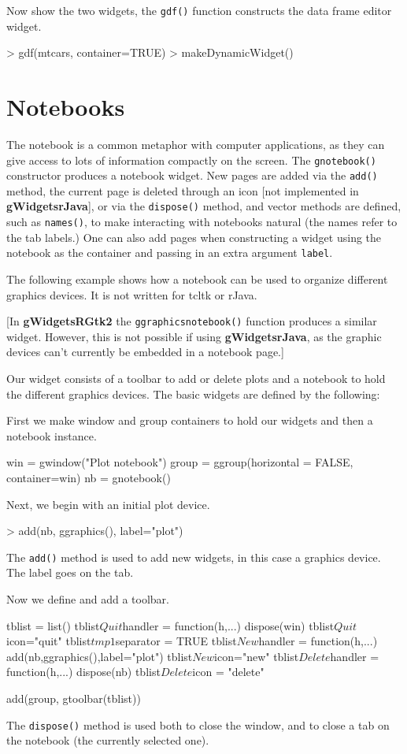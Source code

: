 \documentclass[12pt]{article}
\newcommand{\RCode}[1]{\texttt{#1}}
\newcommand{\RFunc}[1]{\texttt{#1()}}
\newcommand{\RPackage}[1]{\textbf{#1}}
\begin{document}
Now show the two widgets, the \RFunc{gdf} function constructs the data
frame editor widget.
\begin{Soutput}
> gdf(mtcars, container=TRUE)
> makeDynamicWidget()
\end{Soutput}


\section{Notebooks}

The notebook is a common metaphor with computer applications, as they
can give access to lots of information compactly on the screen. The
\RFunc{gnotebook} constructor produces a notebook widget. New pages
are added via the \RFunc{add} method, the current page is deleted
through an icon [not implemented in \RPackage{gWidgetsrJava}], or via
the \RFunc{dispose} method, and vector methods are defined, such as
\RFunc{names}, to make interacting with notebooks natural (the names
refer to the tab labels.) One can also add pages when constructing a
widget using the notebook as the container and passing in an extra
argument \RCode{label}.

The following example shows how a notebook can be used to organize
different graphics devices. It is not written for tcltk or rJava.

[In \RPackage{gWidgetsRGtk2} the
\RFunc{ggraphicsnotebook} function produces a  similar
widget. However, this is not possible if using
\RPackage{gWidgetsrJava}, as the graphic devices can't currently be
embedded in a notebook page.]

Our widget consists of a toolbar to add or delete plots and a notebook
to hold the different graphics devices. The basic widgets are defined
by the following:

First we make window and group containers to hold our widgets and then
a notebook instance.
\begin{Scode}
  win = gwindow("Plot notebook")
  group = ggroup(horizontal = FALSE, container=win)
  nb = gnotebook()
\end{Scode}
Next, we begin with an initial plot device.
\begin{Soutput}
> add(nb, ggraphics(), label="plot")
\end{Soutput}
The \RFunc{add} method is used to add new widgets, in this case a
graphics device. The label goes on the tab.

Now we define and add a toolbar.
\begin{Scode}
  tblist = list()
  tblist$Quit$handler = function(h,...) dispose(win)
  tblist$Quit$icon="quit"
  tblist$tmp1$separator = TRUE
  tblist$New$handler = function(h,...) add(nb,ggraphics(),label="plot")
  tblist$New$icon="new"
  tblist$Delete$handler = function(h,...) dispose(nb)
  tblist$Delete$icon = "delete"

  add(group, gtoolbar(tblist))
\end{Scode}
The \RFunc{dispose} method is used both to close the window, and to close
a tab on the notebook (the currently selected one).
\end{document}
